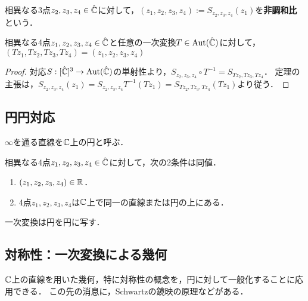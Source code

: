 \documentclass[uplatex, dvipdfmx]{jsreport}
\begin{document}
\begin{definition}
    相異なる3点$z_2,z_3,z_4\in\hat{\mathbb{C}}$に対して，$(z_1,z_2,z_3,z_4):=S_{z_2,z_3,z_4}(z_1)$を\textbf{非調和比}という．
\end{definition}

\begin{theorem}
    相異なる4点$z_1,z_2,z_3,z_4\in\hat{\mathbb{C}}$と任意の一次変換$T\in\mathrm{Aut}(\hat{\mathbb{C}})$に対して，$(Tz_1,Tz_2,Tz_3,Tz_4)=(z_1,z_2,z_3,z_4)$
\end{theorem}
\begin{proof}
    対応$S:[\hat{\mathbb{C}}]^3\to\mathrm{Aut}(\hat{\mathbb{C}})$の単射性より，$S_{z_2,z_3,z_4}\circ T^{-1}=S_{Tz_2,Tz_3,Tz_4}$．
    定理の主張は，$S_{z_2,z_3,z_4}(z_1)=S_{z_2,z_3,z_4}T^{-1}(Tz_1)=S_{Tz_2,Tz_3,Tz_4}(Tz_1)$より従う．
\end{proof}

\subsection{円円対応}

\begin{notation}
    $\infty$を通る直線を$\mathbb{C}$上の円と呼ぶ．
\end{notation}

\begin{theorem}
    相異なる4点$z_1,z_2,z_3,z_4\in\hat{\mathbb{C}}$に対して，次の2条件は同値．
    \begin{enumerate}
        \item $(z_1,z_2,z_3,z_4)\in\mathbb{R}$．
        \item 4点$z_1,z_2,z_3,z_4$は$\mathbb{C}$上で同一の直線または円の上にある．
    \end{enumerate}
\end{theorem}

\begin{corollary}
    一次変換は円を円に写す．
\end{corollary}

\subsection{対称性：一次変換による幾何}

\begin{tcolorbox}[colframe=ForestGreen, colback=ForestGreen!10!white,breakable,colbacktitle=ForestGreen!40!white,coltitle=black,fonttitle=\bfseries\sffamily,
title=]
    $\mathbb{C}$上の直線を用いた幾何，特に対称性の概念を，円に対して一般化することに応用できる．
    この先の消息に，Schwartzの鏡映の原理などがある．
\end{tcolorbox}
\end{document}
